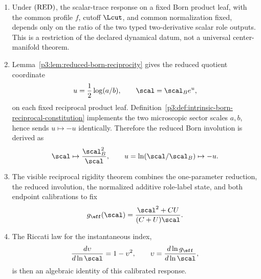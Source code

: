 \documentclass[11pt,a4paper]{article}
\begin{document}
\begin{enumerate}
\item Under \(({\rm RED})\), the scalar-trace response on a fixed Born
product leaf, with the common profile \(f\), cutoff \(\Lcut\), and common
normalization fixed, depends only on the ratio of the two typed
two-derivative scalar role outputs.  This is a restriction of the declared
dynamical datum, not a
universal center-manifold theorem.
    \item Lemma~\ref{p3:lem:reduced-born-reciprocity} gives the reduced quotient coordinate
    \[
    u=\frac12\log(a/b),\qquad \scal=\scal_B e^u,
    \]
    on each fixed reciprocal product leaf.  Definition~\ref{p3:def:intrinsic-born-reciprocal-constitution} implements the two microscopic sector scales \(a,b\), hence sends \(u\mapsto -u\) identically.  Therefore the reduced Born involution is derived as
    \[
    \scal \mapsto \frac{\scal_B^2}{\scal},
    \qquad
    u=\ln(\scal/\scal_B)\mapsto -u.
    \]
    \item The visible reciprocal rigidity theorem combines the one-parameter
    reduction, the reduced involution, the normalized additive role-label
    state, and both
    endpoint calibrations to fix
    \[
    g_{\eff}(\scal)=\frac{\scal^2+CU}{(C+U)\scal}.
    \]
    \item The Riccati law for the instantaneous index,
    \[
    \frac{d\upsilon}{d\ln\scal}=1-\upsilon^2,
    \qquad
    \upsilon=\frac{d\ln g_{\eff}}{d\ln\scal},
    \]
    is then an algebraic identity of this calibrated response.
\end{enumerate}
\end{document}
